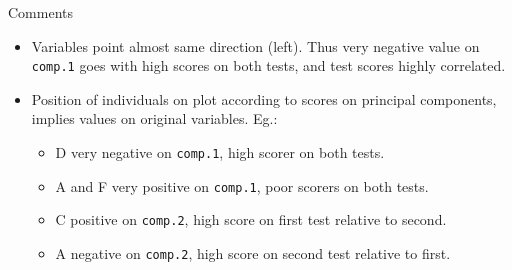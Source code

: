 \documentclass[unknownkeysallowed]{beamer}\usepackage[]{graphicx}\usepackage[]{color}
\begin{document}
\begin{frame}[fragile]{Comments}
  
  \begin{itemize}
  \item Variables point almost same direction (left). Thus very
    negative value on \texttt{comp.1} goes with high scores on both
    tests, and test scores highly correlated.
  \item Position of individuals on plot according to scores on
    principal components, implies values on original variables. Eg.:
    \begin{itemize}
    \item D very negative on \texttt{comp.1}, high scorer on both tests.
    \item A and F very positive on \texttt{comp.1}, poor scorers on
      both tests.
    \item C positive on \texttt{comp.2}, high score on first
      test relative to second.
    \item A negative on \texttt{comp.2}, high score on second test
      relative to first.
    \end{itemize}
  \end{itemize}
  
\end{frame}
\end{document}
